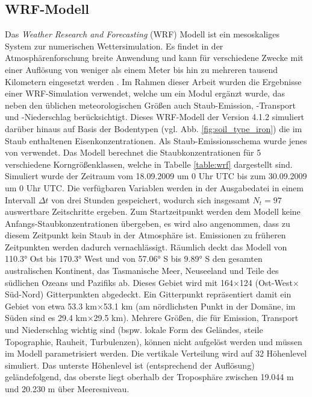 \documentclass[12pt,a4paper,onecolumn,headheight=30pt]{scrartcl}
\begin{document}
\subsection{WRF-Modell} \label{sec:wrf}
Das \textit{Weather Research and Forecasting} (WRF) Modell ist ein mesoskaliges System zur numerischen Wettersimulation. Es findet in der Atmosphärenforschung breite Anwendung und kann für verschiedene Zwecke mit einer Auflösung von weniger als einem Meter bis hin zu mehreren tausend Kilometern eingesetzt werden \citep{NCAR.2021}. Im Rahmen dieser Arbeit wurden die Ergebnisse einer WRF-Simulation verwendet, welche um ein Modul ergänzt wurde, das neben den üblichen meteorologischen Größen auch Staub-Emission, -Transport und -Niederschlag berücksichtigt. Dieses WRF-Modell der Version 4.1.2 simuliert darüber hinaus auf Basis der Bodentypen (vgl. Abb. \ref{fig:soil_type_iron}) die im Staub enthaltenen Eisenkonzentrationen. Als Staub-Emissionsschema wurde jenes von \citet{Shao.2004} verwendet. Das Modell berechnet die Staubkonzentrationen für 5 verschiedene Korngrößenklassen, welche in Tabelle \ref{table:wrf} dargestellt sind. Simuliert wurde der Zeitraum vom 18.09.2009 um 0 Uhr UTC bis zum 30.09.2009 um 0 Uhr UTC. Die verfügbaren Variablen werden in der Ausgabedatei in einem Intervall $\Delta t$ von drei Stunden gespeichert, wodurch sich insgesamt $N_t = 97$ auswertbare Zeitschritte ergeben. Zum Startzeitpunkt werden dem Modell keine Anfangs-Staubkonzentrationen übergeben, es wird also angenommen, dass zu diesem Zeitpunkt kein Staub in der Atmosphäre ist. Emissionen zu früheren Zeitpunkten werden dadurch vernachlässigt. Räumlich deckt das Modell von 110.3° Ost bis 170.3° West und von 57.06° S bis 9.89° S den gesamten australischen Kontinent, das Tasmanische Meer, Neuseeland und Teile des südlichen Ozeans und Pazifiks ab. Dieses Gebiet wird mit 164$\times$124 (Ost-West$\times$Süd-Nord) Gitterpunkten abgedeckt. Ein Gitterpunkt repräsentiert damit ein Gebiet von etwa 53.3 km$\times$53.1 km (am nördlichsten Punkt in der Domäne, im Süden sind es 29.4 km$\times$29.5 km). Mehrere Größen, die für Emission, Transport und Niederschlag wichtig sind (bspw. lokale Form des Geländes, steile Topographie, Rauheit, Turbulenzen), können nicht aufgelöst werden und müssen im Modell parametrisiert werden. Die vertikale Verteilung wird auf 32 Höhenlevel simuliert. Das unterste Höhenlevel ist (entsprechend der Auflösung) geländefolgend, das oberste liegt oberhalb der Troposphäre zwischen 19.044 m und 20.230 m über Meeresniveau.
\end{document}
